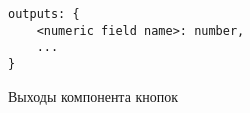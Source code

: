 \begin{figure}[ht]
	\centering
	\vspace{\toppaddingoffigure}
	\begin{lstlisting}
outputs: {
    <numeric field name>: number,
    ...
}
    \end{lstlisting}
	\caption{Выходы компонента кнопок}
	\label{f:button-component-outputs}
\end{figure}



